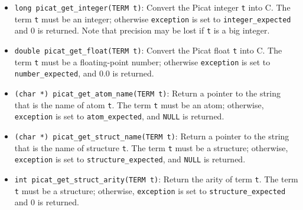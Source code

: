 \begin{itemize}
\item \texttt{long picat\_get\_integer(TERM t)}: Convert the Picat integer \texttt{t} into C. The term \texttt{t} must be an integer; otherwise \texttt{exception} is set to \texttt{integer\_expected} and 0 is returned. Note that precision may be lost if \texttt{t} is a big integer.

\item \texttt{double picat\_get\_float(TERM t)}: Convert the Picat float \texttt{t} into C. The term \texttt{t} must be a floating-point number; otherwise \texttt{exception} is set to \texttt{number\_expected}, and 0.0 is returned. 

\item \texttt{(char *) picat\_get\_atom\_name(TERM t)}: Return a pointer to the string that is the name of atom \texttt{t}. The term \texttt{t} must be an atom; otherwise, \texttt{exception} is set to \texttt{atom\_expected}, and \texttt{NULL} is returned. 

\item \texttt{(char *) picat\_get\_struct\_name(TERM t)}: Return a pointer to the string that is the name of structure \texttt{t}. The term \texttt{t} must be a structure; otherwise, \texttt{exception} is set to \texttt{structure\_expected}, and \texttt{NULL} is returned. 

\item \texttt{int picat\_get\_struct\_arity(TERM t)}: Return the arity of term \texttt{t}.  The term \texttt{t} must be a structure; otherwise, \texttt{exception} is set to \texttt{structure\_expected} and 0 is returned.
\end{itemize}

